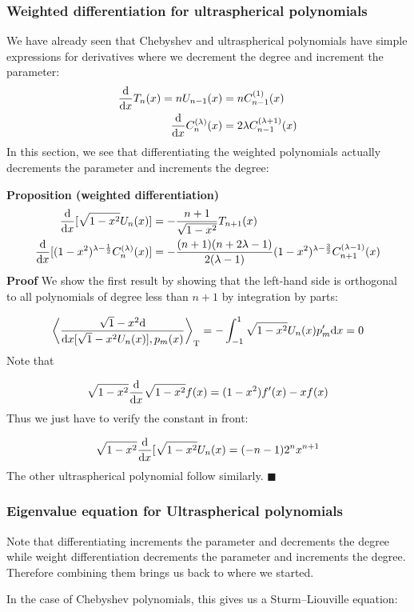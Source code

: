 \documentclass[12pt,landscape]{article}
\def\half{ {1 \over 2} }
\def\D{ {\rm d} }
\def\ip<#1>{\left\langle{#1}\right\rangle}
\def\dx{\D x}
\def\endash{–}
\begin{document}
{\subsubsection{Weighted differentiation for ultraspherical polynomials}
We have already seen that Chebyshev and ultraspherical polynomials have simple expressions for derivatives where we decrement the degree and increment the parameter:
\begin{align*}
{\D \over \dx } T_n(x) = n U_{n-1}(x) &= n C_{n-1}^{(1)}(x) \\
{\D \over \dx } C_n^{(\lambda)}(x) & = 2 \lambda C_{n-1}^{(\lambda+1)}(x)
\end{align*}
In this section, we see that differentiating the weighted polynomials actually decrements the parameter and increments the degree:

\textbf{Proposition (weighted differentiation)}
\begin{align*}
{\D \over \dx }[\sqrt{1-x^2} U_n(x)] &= - {n+1 \over \sqrt{1-x^2}} T_{n+1}(x) \\
{\D \over \dx }[(1-x^2)^{\lambda-\half} C_n^{(\lambda)}(x)] & = -{(n+1) (n+2 \lambda-1) \over 2 (\lambda-1) }  (1-x^2)^{\lambda - {3 \over 2}} C_{n+1}^{(\lambda-1)}(x)
\end{align*}
\newpage
\textbf{Proof} We show the first result by showing that the left-hand side is orthogonal to all  polynomials of degree less than $n+1$ by integration by parts:

\[
\ip< \sqrt{1-x^2} {\D \over \dx }[\sqrt{1-x^2} U_n(x)], p_m(x)>_{\rm T} = -\int_{-1}^1 \sqrt{1-x^2} U_n(x) p_m' \dx =0
\]
Note that

\[
\sqrt{1-x^2} {\D \over \dx } \sqrt{1-x^2} f(x) = (1-x^2) f'(x) - x f(x)
\]
Thus we just have to verify the constant in front:

\[
\sqrt{1-x^2} {\D \over \dx }[\sqrt{1-x^2} U_n(x) = (-n -1) 2^n x^{n+1}
\]
The other ultraspherical polynomial follow similarly. \ensuremath{\blacksquare}
\newpage
\subsubsection{Eigenvalue equation for Ultraspherical polynomials}
Note that differentiating increments the parameter and decrements the degree while weight differentiation decrements the parameter and increments the degree. Therefore combining them brings us back to where we started.

In the case of Chebyshev polynomials, this gives us a Sturm\ensuremath{\endash}Liouville equation:

}
\end{document}
